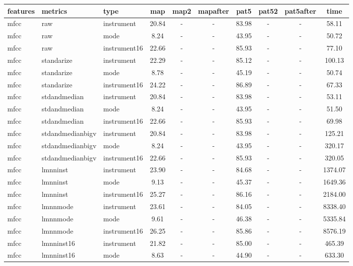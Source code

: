 \begin{tabular}{lllccccccc} 
features & metrics & type & map & map2 & mapafter & pat5 & pat52 & pat5after & time \\ 
\hline 
mfcc & raw & instrument & 20.84 &   - &   - & 83.98 &   - &   - &     58.11 \\ 
mfcc & raw & mode &  8.24 &   - &   - & 43.95 &   - &   - &     50.72 \\ 
mfcc & raw & instrument16 & 22.66 &   - &   - & 85.93 &   - &   - &     77.10 \\ 
mfcc & standarize & instrument & 22.29 &   - &   - & 85.12 &   - &   - &    100.13 \\ 
mfcc & standarize & mode &  8.78 &   - &   - & 45.19 &   - &   - &     50.74 \\ 
mfcc & standarize & instrument16 & 24.22 &   - &   - & 86.89 &   - &   - &     67.33 \\ 
mfcc & stdandmedian & instrument & 20.84 &   - &   - & 83.98 &   - &   - &     53.11 \\ 
mfcc & stdandmedian & mode &  8.24 &   - &   - & 43.95 &   - &   - &     51.50 \\ 
mfcc & stdandmedian & instrument16 & 22.66 &   - &   - & 85.93 &   - &   - &     69.98 \\ 
mfcc & stdandmedianbigv & instrument & 20.84 &   - &   - & 83.98 &   - &   - &    125.21 \\ 
mfcc & stdandmedianbigv & mode &  8.24 &   - &   - & 43.95 &   - &   - &    320.17 \\ 
mfcc & stdandmedianbigv & instrument16 & 22.66 &   - &   - & 85.93 &   - &   - &    320.05 \\ 
mfcc & lmnninst & instrument & 23.90 &   - &   - & 84.68 &   - &   - &   1374.07 \\ 
mfcc & lmnninst & mode &  9.13 &   - &   - & 45.37 &   - &   - &   1649.36 \\ 
mfcc & lmnninst & instrument16 & 25.27 &   - &   - & 86.16 &   - &   - &   2184.00 \\ 
mfcc & lmnnmode & instrument & 23.61 &   - &   - & 84.05 &   - &   - &   8338.40 \\ 
mfcc & lmnnmode & mode &  9.61 &   - &   - & 46.38 &   - &   - &   5335.84 \\ 
mfcc & lmnnmode & instrument16 & 26.25 &   - &   - & 85.86 &   - &   - &   8576.19 \\ 
mfcc & lmnninst16 & instrument & 21.82 &   - &   - & 85.00 &   - &   - &    465.39 \\ 
mfcc & lmnninst16 & mode &  8.63 &   - &   - & 44.90 &   - &   - &    633.30 \\ 

\end{tabular}
